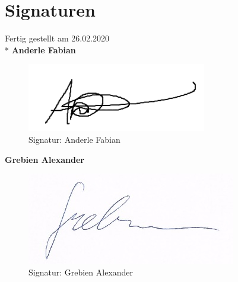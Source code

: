 \newcommand{\german}{true} %
\newcommand{\coloredTitlePage}{true} %
\newcommand{\company}{false}
\newcommand{\ECE}{true}

\usepackage{hyperref}

\makeglossaries



\makeatletter
\newcommand{\myscope}[2] %
{\draw[thick,rotate=#2] (#1) circle (12pt)
 (#1) ++(-0.35,-0.1) -- ++(0.3,0.3) --++(0,-0.3)-- ++(0.3,0.3) --++(0,-0.3);
}



\frontmatter
\renewcommand{\thepage}{\Roman{page}}



\tableofcontents
\printglossary
\mainmatter






        
\newpage
\chapter{Signaturen}
    Fertig gestellt am 26.02.2020
    \\*
    \textbf{Anderle Fabian}
    \begin{figure}[H]
        \centering
        \includegraphics{pics/signature_anderle.png}
    	\caption{Signatur: Anderle Fabian}
    	\label{pic:signatur_anderle}
    \end{figure}
    
    \textbf{Grebien Alexander}
    \begin{figure}[H]
        \centering
        \includegraphics{pics/signature_grebien.png}
    	\caption{Signatur: Grebien Alexander}
    	\label{pic:signatur_grebien}
    \end{figure}
        
\listoffigures
\listoftables

